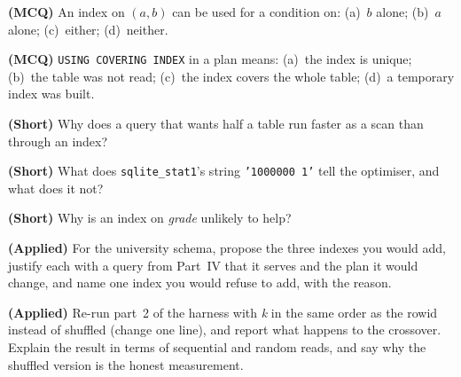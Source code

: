 \begin{reviewq}
  \item \textbf{(MCQ)} An index on $(a, b)$ can be used for a condition on:
        (a)~$b$ alone; (b)~$a$ alone; (c)~either; (d)~neither.
  \item \textbf{(MCQ)} \texttt{USING COVERING INDEX} in a plan means:
        (a)~the index is unique; (b)~the table was not read; (c)~the index
        covers the whole table; (d)~a temporary index was built.
  \item \textbf{(Short)} Why does a query that wants half a table run faster as
        a scan than through an index?
  \item \textbf{(Short)} What does \texttt{sqlite\_stat1}'s string
        \texttt{'1000000 1'} tell the optimiser, and what does it not?
  \item \textbf{(Short)} Why is an index on \textit{grade} unlikely to help?
  \item \textbf{(Applied)} For the university schema, propose the three indexes
        you would add, justify each with a query from Part~IV that it serves
        and the plan it would change, and name one index you would refuse to
        add, with the reason.
  \item \textbf{(Applied)} Re-run part~2 of the harness with \textit{k} in the
        same order as the rowid instead of shuffled (change one line), and
        report what happens to the crossover. Explain the result in terms of
        sequential and random reads, and say why the shuffled version is the
        honest measurement.
\end{reviewq}
